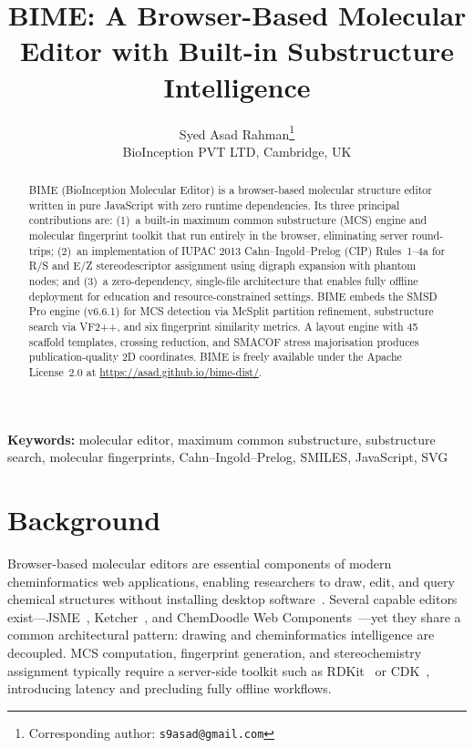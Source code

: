 \documentclass[twocolumn]{article}
\title{BIME: A Browser-Based Molecular Editor with Built-in Substructure Intelligence}
\author{
  Syed Asad Rahman\thanks{Corresponding author: \texttt{s9asad@gmail.com}} \\
  BioInception PVT LTD, Cambridge, UK
}
\date{}
\begin{document}
\maketitle

\begin{abstract}
BIME (BioInception Molecular Editor) is a browser-based molecular
structure editor written in pure JavaScript with zero runtime
dependencies.  Its three principal contributions are: (1)~a built-in
maximum common substructure (MCS) engine and molecular fingerprint
toolkit that run entirely in the browser, eliminating server
round-trips; (2)~an implementation of IUPAC 2013 Cahn--Ingold--Prelog
(CIP) Rules~1--4a for R/S and E/Z stereodescriptor assignment using
digraph expansion with phantom nodes; and (3)~a zero-dependency,
single-file architecture that enables fully offline deployment for
education and resource-constrained settings.  BIME embeds the SMSD Pro
engine (v6.6.1) for MCS detection via McSplit partition refinement,
substructure search via VF2++, and six fingerprint similarity metrics.
A layout engine with 45 scaffold templates, crossing reduction, and
SMACOF stress majorisation produces publication-quality 2D coordinates.
BIME is freely available under the Apache License~2.0 at
\url{https://asad.github.io/bime-dist/}.
\end{abstract}

\noindent\textbf{Keywords:} molecular editor, maximum common
substructure, substructure search, molecular fingerprints,
Cahn--Ingold--Prelog, SMILES, JavaScript, SVG

\section{Background}

Browser-based molecular editors are essential components of modern
cheminformatics web applications, enabling researchers to draw, edit,
and query chemical structures without installing desktop
software~\citep{Bienfait2013,Ertl2010}.  Several capable editors
exist---JSME~\citep{Bienfait2013}, Ketcher~\citep{Ketcher2024}, and
ChemDoodle Web Components~\citep{Burger2015}---yet they share a common
architectural pattern: drawing and cheminformatics intelligence are
decoupled.  MCS computation, fingerprint generation, and stereochemistry
assignment typically require a server-side toolkit such as
RDKit~\citep{Landrum2006} or CDK~\citep{Steinbeck2003}, introducing
latency and precluding fully offline workflows.
\end{document}
